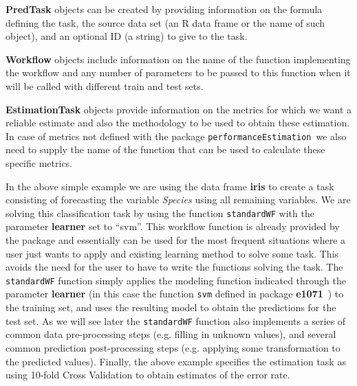 \documentclass[10pt,a4paper]{article}\usepackage[]{graphicx}\usepackage[]{color}
\newcommand{\PE}{package \texttt{performanceEstimation}\ }
\begin{document}
\textbf{PredTask} objects can be created by providing information on the formula defining the task, the source data set (an R data frame or the name of such object), and an optional ID (a string) to give to the task.

\textbf{Workflow} objects include information on the name of the function implementing the workflow and any number of parameters to be passed to this function when it will be called with different train and test sets.

\textbf{EstimationTask} objects provide information on the metrics for which we want a reliable estimate and also the methodology to be used to obtain these estimation. In case of metrics not defined with the \PE we also need to supply the name of the function that can be used to calculate these specific metrics.

In the above simple example we are using the data frame \textbf{iris} to create a task consisting of forecasting the variable \textit{Species} using all remaining variables. We are solving this classification task by using the function \texttt{standardWF} with the parameter \textbf{learner} set to ``svm''. This workflow function is already provided by the package and essentially can be used for the most frequent situations where a user just wants to apply and existing learning method to solve some task. This avoids the need for the user to have to write the functions solving the task. The \texttt{standardWF} function simply applies the modeling function indicated through the parameter \textbf{learner} (in this case the function \texttt{svm} defined in package \textbf{e1071}~\cite{e1071}) to the training set, and uses the resulting model to obtain the predictions for the test set. As we will see later the \texttt{standardWF} function also implements a series of common data pre-processing steps (e.g. filling in unknown values), and several common prediction post-processing steps (e.g. applying some transformation to the predicted values). Finally, the above example specifies the estimation task as using 10-fold Cross Validation to obtain estimates of the error rate. 



\end{document}
